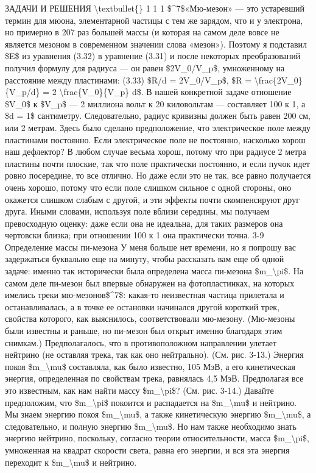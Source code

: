 \documentclass[10pt,oneside]{article}
\begin{document}
ЗАДАЧИ И РЕШЕНИЯ \textbackslash{}textbullet\{\} 1 1 1 \$\textasciicircum{}7\$«Мю-мезон» --- это устаревший термин для мюона, элементарной частицы с тем же зарядом, что и у электрона, но примерно в 207 раз большей массы (и которая на самом деле вовсе не является мезоном в современном значении слова «мезон»). Поэтому я подставил \$E\$ из уравнения (3.32) в уравнение (3.31) и после некоторых преобразований получил формулу для радиуса --- он равен \$2V\_0/V\_p\$, умноженному на расстояние между пластинами: (3.33) \$R/d = 2V\_0/V\_p\$, \$R = \textbackslash{}frac\{2V\_0\}\{V\_p/d\} = 2 \textbackslash{}frac\{V\_0\}\{V\_p\} d\$. В нашей конкретной задаче отношение \$V\_0\$ к \$V\_p\$ --- 2 миллиона вольт к 20 киловольтам --- составляет 100 к 1, а \$d = 1\$ сантиметру. Следовательно, радиус кривизны должен быть равен 200 см, или 2 метрам. Здесь было сделано предположение, что электрическое поле между пластинами постоянно. Если электрическое поле не постоянно, насколько хорош наш дефлектор? В любом случае весьма хорош, потому что при радиусе 2 метра пластины почти плоские, так что поле практически постоянно, и если пучок идет ровно посередине, то все отлично. Но даже если это не так, все равно получается очень хорошо, потому что если поле слишком сильное с одной стороны, оно окажется слишком слабым с другой, и эти эффекты почти скомпенсируют друг друга. Иными словами, используя поле вблизи середины, мы получаем превосходную оценку: даже если она не идеальна, для таких размеров она чертовски близка; при отношении 100 к 1 она практически точна. 3-9 Определение массы пи-мезона У меня больше нет времени, но я попрошу вас задержаться буквально еще на минуту, чтобы рассказать вам еще об одной задаче: именно так исторически была определена масса пи-мезона \$m\_\textbackslash{}pi\$. На самом деле пи-мезон был впервые обнаружен на фотопластинках, на которых имелись треки мю-мезонов\$\textasciicircum{}7\$: какая-то неизвестная частица прилетала и останавливалась, а в точке ее остановки начинался другой короткий трек, свойства которого, как выяснилось, соответствовали мю-мезону. (Мю-мезоны были известны и раньше, но пи-мезон был открыт именно благодаря этим снимкам.) Предполагалось, что в противоположном направлении улетает нейтрино (не оставляя трека, так как оно нейтрально). (См. рис. 3-13.) Энергия покоя \$m\_\textbackslash{}mu\$ составляла, как было известно, 105 МэВ, а его кинетическая энергия, определенная по свойствам трека, равнялась 4,5 МэВ. Предполагая все это известным, как нам найти массу \$m\_\textbackslash{}pi\$? (См. рис. 3-14.) Давайте предположим, что \$m\_\textbackslash{}pi\$ покоится и распадается на \$m\_\textbackslash{}mu\$ и нейтрино. Мы знаем энергию покоя \$m\_\textbackslash{}mu\$, а также кинетическую энергию \$m\_\textbackslash{}mu\$, а следовательно, и полную энергию \$m\_\textbackslash{}mu\$. Но нам также необходимо знать энергию нейтрино, поскольку, согласно теории относительности, масса \$m\_\textbackslash{}pi\$, умноженная на квадрат скорости света, равна его энергии, и вся эта энергия переходит к \$m\_\textbackslash{}mu\$ и нейтрино.\par
\end{document}
